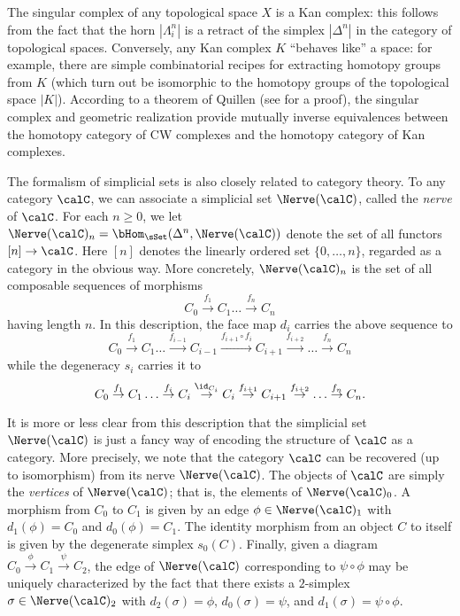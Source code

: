 The singular complex of any topological space $X$ is a Kan complex: this follows from the fact that the horn $| \Lambda^n_i |$ is a retract of the simplex $| \Delta^n |$ in the category of topological spaces. Conversely, any Kan complex $K$ ``behaves like'' a space: for example, there are simple combinatorial recipes for extracting homotopy groups from $K$ (which turn out be isomorphic to the homotopy groups of the topological space $|K|$). According to a theorem of Quillen (see \cite{goerssjardine} for a proof), the singular complex and geometric realization provide mutually inverse equivalences between the homotopy category of CW complexes and the homotopy category of Kan complexes.

The formalism of simplicial sets is also closely related to category theory. To any category $\calC$, we can associate a simplicial set $\Nerve(\calC)$, called the {\it nerve} of $\calC$. For each $n \geq 0$, we 
let $\Nerve(\calC)_{n} = \bHom_{\sSet}(\Delta^n, \Nerve(\calC))$ denote the set of all functors $[n]
\rightarrow \calC$. Here $[n]$ denotes the linearly ordered set $\{ 0, \ldots, n \}$, regarded as a category in the obvious way. More
concretely, $\Nerve(\calC)_n$ is the set of all composable
sequences of morphisms
$$ C_0 \stackrel{f_1}{\rightarrow} C_1 \ldots \stackrel{f_n}{\rightarrow} C_n$$ having length $n$.
In this description, the face map $d_i$ carries the above sequence
to
$$C_0 \stackrel{f_1}{\rightarrow} C_1 \ldots \stackrel{f_{i-1}}{\rightarrow}
C_{i-1} \stackrel{ f_{i+1} \circ f_i }{\rightarrow} C_{i+1}
\stackrel{f_{i+2}}{\rightarrow} \ldots
\stackrel{f_{n}}{\rightarrow} C_n$$ while the degeneracy $s_i$
carries it to $$C_0 \stackrel{f_1}{\rightarrow} C_1 \ldots
\stackrel{f_i}{\rightarrow} C_i \stackrel{\id_{C_i}}{\rightarrow}
C_i \stackrel{f_{i+1}}{\rightarrow} C_{i+1}
\stackrel{f_{i+2}}{\rightarrow} \ldots \stackrel{f_n}{\rightarrow}
C_n.$$

It is more or less clear from this description that the simplicial
set $\Nerve(\calC)$ is just a fancy way of encoding the structure
of $\calC$ as a category. More precisely, we note that the
category $\calC$ can be recovered (up to isomorphism) from its
nerve $\Nerve(\calC)$. The objects of $\calC$ are simply the {\it
vertices} of $\Nerve(\calC)$; that is, the elements of $\Nerve
(\calC)_0$. A morphism from $C_0$ to $C_1$ is given by an edge $\phi
\in \Nerve(\calC)_1$ with $d_1(\phi) = C_0$ and $d_0(\phi)=C_1$. The
identity morphism from an object $C$ to itself is given by the
degenerate simplex $s_0(C)$. Finally, given a diagram $C_0
\stackrel{\phi}{\rightarrow} C_1 \stackrel{\psi}{\rightarrow}
C_2$, the edge of $\Nerve(\calC)$ corresponding to $\psi \circ
\phi$ may be uniquely characterized by the fact that there exists
a $2$-simplex $\sigma \in \Nerve(\calC)_2$ with $d_2(\sigma)=\phi$,
$d_0(\sigma)=\psi$, and $d_1(\sigma)=\psi \circ \phi$.

